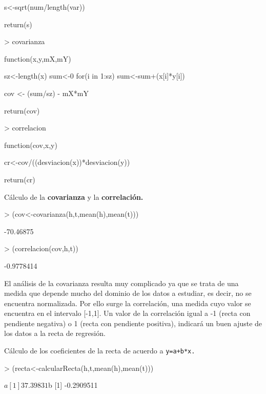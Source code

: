 \documentclass [a4paper] {article}
\begin{document}
\begin{Schunk}
\begin{Soutput}
{    s<-sqrt(num/length(var))

    return(s)
}
\end{Soutput}
\begin{Sinput}
> covarianza
\end{Sinput}
\begin{Soutput}
function(x,y,mX,mY){
    sz<-length(x)
    sum<-0
    for(i in 1:sz){
        sum<-sum+(x[i]*y[i])
    }

    cov <- (sum/sz) - mX*mY

    return(cov)
}
\end{Soutput}
\begin{Sinput}
> correlacion
\end{Sinput}
\begin{Soutput}
function(cov,x,y){
    cr<-cov/((desviacion(x))*desviacion(y))

    return(cr)
}
\end{Soutput}
\end{Schunk}

\bigskip
Cálculo de la \textbf{covarianza} y la \textbf{correlación.}
\begin{Schunk}
\begin{Sinput}
> (cov<-covarianza(h,t,mean(h),mean(t)))
\end{Sinput}
\begin{Soutput}
[1] -70.46875
\end{Soutput}
\begin{Sinput}
> (correlacion(cov,h,t))
\end{Sinput}
\begin{Soutput}
[1] -0.9778414
\end{Soutput}
\end{Schunk}

\bigskip
El análisis de la covarianza resulta muy complicado ya que se trata de una medida que depende mucho del dominio de los datos
a estudiar, es decir, no se encuentra normalizada. Por ello surge la correlación, una medida cuyo valor se encuentra en el
intervalo [-1,1]. Un valor de la correlación igual a -1 (recta con pendiente negativa) o 1 (recta con pendiente positiva), indicará
un buen ajuste de los datos a la recta de regresión.

\bigskip
Cálculo de los coeficientes de la recta de acuerdo a \texttt{y=a+b*x.}
\begin{Schunk}
\begin{Sinput}
> (recta<-calcularRecta(h,t,mean(h),mean(t)))
\end{Sinput}
\begin{Soutput}
$a
[1] 37.39831

$b
[1] -0.2909511
\end{Soutput}
\end{Schunk}
\end{document}
